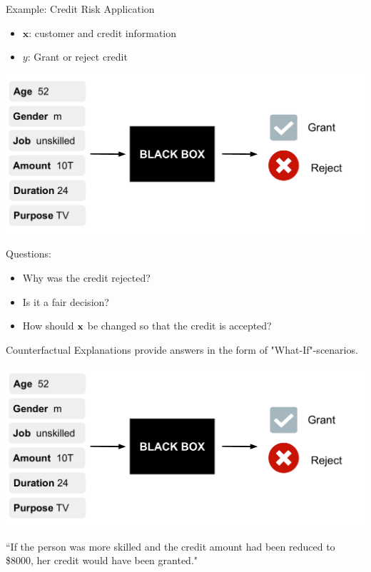 \documentclass[11pt,compress,t,notes=noshow, xcolor=table]{beamer}
\begin{document}
\begin{vbframe}{Example: Credit Risk Application} 
	\begin{itemize}
		\item $\textbf{x}$: customer and credit information
		\item $y$: Grant or reject credit
	\end{itemize}
	\begin{center}\includegraphics[width=0.65\linewidth, page=1]{figure/counterfactuals_credit.pdf} \end{center}
	
	Questions: 
	\begin{itemize}
		\item Why was the credit rejected? 
		\item Is it a fair decision? 
		\item How should $\xv$ be changed so that the credit is accepted?  
	\end{itemize}
	
	\framebreak
	Counterfactual Explanations provide answers in the form of "What-If"-scenarios. 
	\begin{center}\includegraphics[width=0.65\linewidth, page=2]{figure/counterfactuals_credit.pdf} \end{center}
	
	``If the person was more skilled and the credit amount had been reduced to \$8000, her credit would have been granted."  \\[0.2cm]
	
\end{vbframe}
\end{document}
